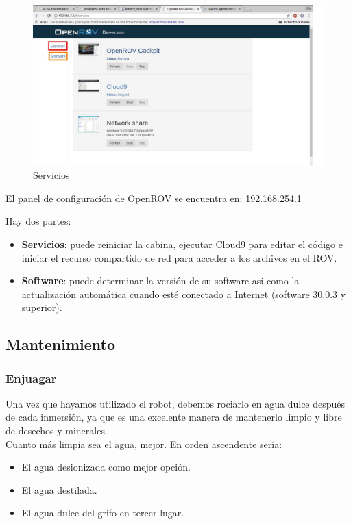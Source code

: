 \begin{figure} [hbtp]
\begin{center}
  \includegraphics[width=12cm]{img/cap3/3_5/services}
\end{center}
\caption{Servicios}
\label{fig:services}
\end{figure}

El panel de configuración de OpenROV se encuentra en: 192.168.254.1

Hay dos partes:
\begin{itemize}
\item[\textcolor{red}{\textbullet}]\textbf{Servicios}: puede reiniciar la cabina, ejecutar Cloud9 para editar el código e iniciar el recurso compartido de red para acceder a los archivos en el ROV.
\item[\textcolor{orange}{\textbullet}]\textbf{Software}: puede determinar la versión de su software así como la actualización automática cuando esté conectado a Internet (software 30.0.3 y superior).
\end{itemize}

\subsection{Mantenimiento}
\label{subsec:mantenimiento}

\subsubsection{Enjuagar}
\label{subsubsec:enjuagar}
Una vez que hayamos utilizado el robot, debemos rociarlo en agua dulce después de cada inmersión, ya que es una excelente manera de mantenerlo limpio y libre de desechos y minerales.
\\Cuanto más limpia sea el agua, mejor. En orden ascendente sería:
\begin{itemize}
\item El agua desionizada como mejor opción.
\item El agua destilada.
\item El agua dulce del grifo en tercer lugar.
\end{itemize} 
  
